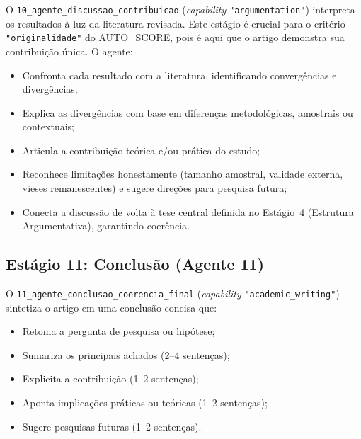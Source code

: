 O \texttt{10\_agente\_discussao\_contribuicao}
(\textit{capability} \texttt{"argumentation"}) interpreta os
resultados à luz da literatura revisada. Este estágio é crucial
para o critério \texttt{"originalidade"} do AUTO\_SCORE, pois é
aqui que o artigo demonstra sua contribuição única. O agente:

\begin{itemize}
    \item Confronta cada resultado com a literatura, identificando
    convergências e divergências;

    \item Explica as divergências com base em diferenças
    metodológicas, amostrais ou contextuais;

    \item Articula a contribuição teórica e/ou prática do estudo;

    \item Reconhece limitações honestamente (tamanho amostral,
    validade externa, vieses remanescentes) e sugere direções para
    pesquisa futura;

    \item Conecta a discussão de volta à tese central definida no
    Estágio~4 (Estrutura Argumentativa), garantindo coerência.
\end{itemize}

\subsection{Estágio 11: Conclusão (Agente 11)}
\label{sec:estagio11}

O \texttt{11\_agente\_conclusao\_coerencia\_final}
(\textit{capability} \texttt{"academic\_writing"}) sintetiza o
artigo em uma conclusão concisa que:

\begin{itemize}
    \item Retoma a pergunta de pesquisa ou hipótese;

    \item Sumariza os principais achados (2--4 sentenças);

    \item Explicita a contribuição (1--2 sentenças);

    \item Aponta implicações práticas ou teóricas (1--2 sentenças);

    \item Sugere pesquisas futuras (1--2 sentenças).
\end{itemize}


